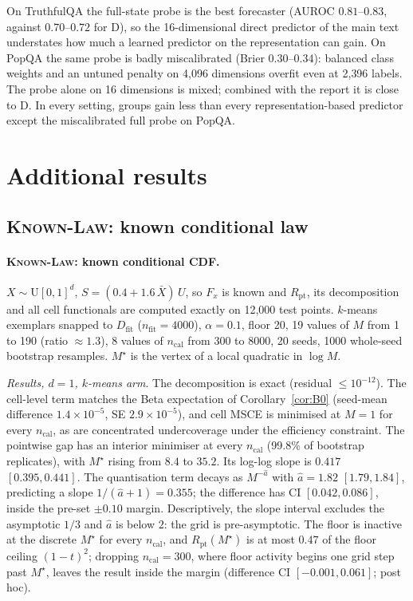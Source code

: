 \documentclass[twoside]{article}
\theoremstyle{definition}
\theoremstyle{remark}
\newcommand{\Dfit}{D_{\mathrm{fit}}}
\newcommand{\1}{\mathbf{1}}
\newcommand{\expname}[1]{\textsc{#1}}
\begin{document}
On TruthfulQA the full-state probe is the best forecaster (AUROC $0.81$--$0.83$, against $0.70$--$0.72$ for D), so
the 16-dimensional direct predictor of the main text understates how much a learned predictor on the
representation can gain. On PopQA the same probe is badly miscalibrated (Brier $0.30$--$0.34$): balanced class
weights and an untuned penalty on 4{,}096 dimensions overfit even at 2{,}396 labels. The probe alone on 16
dimensions is mixed; combined with the report it is close to D. In every setting, groups gain less than every
representation-based predictor except the miscalibrated full probe on PopQA.

\section{Additional results}
\label{app:extra}
\subsection{\expname{Known-Law}: known conditional law}
\label{app:x1}
\paragraph{\expname{Known-Law}: known conditional CDF.}
$X\sim\mathrm{U}[0,1]^d$, $S=(0.4+1.6\,\bar X)\,U$, so $F_x$ is known and $R_{\mathrm{pt}}$,
its decomposition and all cell functionals are computed exactly on 12{,}000 test points.
$k$-means exemplars snapped to $\Dfit$ ($n_{\mathrm{fit}}=4000$), $\alpha=0.1$, floor 20,
19 values of $M$ from 1 to 190 (ratio $\approx1.3$), 8 values of $n_{\mathrm{cal}}$ from 300 to
8000, 20 seeds, 1000 whole-seed bootstrap resamples. $M^\star$ is the vertex of a local
quadratic in $\log M$.

\emph{Results, $d=1$, $k$-means arm}. The decomposition is exact (residual $\le10^{-12}$). The
cell-level term matches the Beta expectation of Corollary~\ref{cor:B0} (seed-mean
difference $1.4\times10^{-5}$, SE $2.9\times10^{-5}$), and cell MSCE is minimised at $M=1$ for
every $n_{\mathrm{cal}}$, as are concentrated undercoverage under the efficiency constraint.
The pointwise gap has an interior minimiser at every $n_{\mathrm{cal}}$ (99.8\% of bootstrap
replicates), with $M^\star$ rising from $8.4$ to $35.2$. Its log-log slope is $0.417$
$[0.395,0.441]$. The quantisation term decays as $M^{-\hat a}$ with $\hat a=1.82$
$[1.79,1.84]$, predicting a slope $1/(\hat a+1)=0.355$; the difference has CI
$[0.042,0.086]$, inside the pre-set $\pm0.10$ margin.
Descriptively, the slope interval excludes the asymptotic $1/3$ and $\hat a$ is below $2$: the
grid is pre-asymptotic. The floor is inactive at the discrete $M^\star$ for every
$n_{\mathrm{cal}}$, and $R_{\mathrm{pt}}(M^\star)$ is at most $0.47$ of the floor ceiling
$(1-t)^2$; dropping $n_{\mathrm{cal}}=300$, where floor activity begins one grid step past
$M^\star$, leaves the result inside the margin (difference CI $[-0.001,0.061]$; post hoc).
\end{document}
